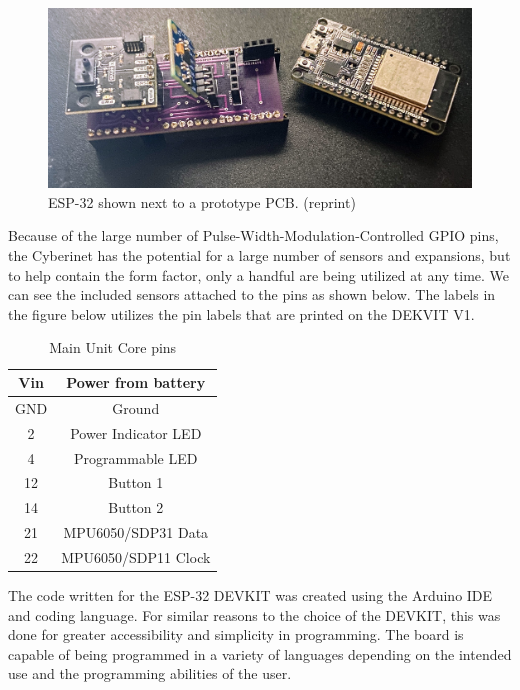 \begin{figure}
    \centering
    \includegraphics[scale=0.15]{diagrams/builtUnits/protoBoard.JPG}
    \caption{ESP-32 shown next to a prototype PCB. (reprint)}
    \label{fig:protoBoard2.1}
\end{figure}

 

Because of the large number of Pulse-Width-Modulation-Controlled GPIO pins, the Cyberinet has the potential for a large number of sensors and expansions, but to help contain the form factor, only a handful are being utilized at any time. We can see the included sensors attached to the pins as shown below. The labels in the figure below utilizes the pin labels that are printed on the DEKVIT V1.

\begin{table}[]
    \centering
    \begin{tabular}{|c||c|}
    \hline
    Vin     & Power from battery \\
     \hline
    GND     & Ground \\
     \hline
    2       & Power Indicator LED \\
     \hline
    4       & Programmable LED \\
     \hline
    12      & Button 1 \\
     \hline
    14      & Button 2 \\
     \hline
    21      & MPU6050/SDP31 Data \\
     \hline
    22      & MPU6050/SDP11 Clock \\
    \hline
    \end{tabular}
    \caption{Main Unit Core pins}
    \label{tab:mainPins}
\end{table}

The code written for the ESP-32 DEVKIT was created using the Arduino IDE and coding language. For similar reasons to the choice of the DEVKIT, this was done for greater accessibility and simplicity in programming. The board is capable of being programmed in a variety of languages depending on the intended use and the programming abilities of the user. %

